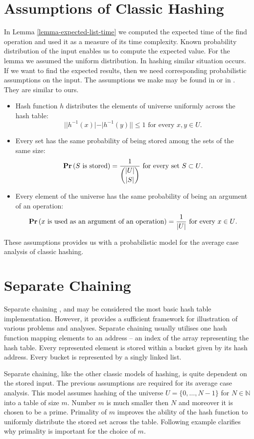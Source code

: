 \section{Assumptions of Classic Hashing}
\label{section-assumptions}
In Lemma \ref{lemma-expected-list-time} we computed the expected time of the find operation and used it as a measure of its time complexity. Known probability distribution of the input enables us to compute the expected value. For the lemma we assumed the uniform distribution. In hashing similar situation occurs. If we want to find the expected results, then we need corresponding probabilistic assumptions on the input. The assumptions we make may be found in \cite{VK-skripta} or in \cite{DBLP:books/sp/Mehlhorn84}. They are similar to ours.
\begin{itemize}
\item Hash function $h$ distributes the elements of universe uniformly across the hash table:
\[
||h^{-1}(x)| - |h^{-1}(y)|| \leq 1 \text{ for every }x, y \in U \text{.}
\]
\item Every set has the same probability of being stored among the sets of the same size:
\[
\mathbf{Pr}\left(S \text{ is stored}\right) = \frac{1}{\dbinom{|U|}{|S|}} \text{ for every set } S \subset U \text{.}
\]
\item Every element of the universe has the same probability of being an argument of an operation:
\[
\mathbf{Pr}\left(x \text{ is used as an argument of an operation}\right) = \frac{1}{|U|} \text{ for every } x \in U \text{.}
\]
\end{itemize}

These assumptions provides us with a probabilistic model for the average case analysis of classic hashing.

\section{Separate Chaining}
Separate chaining \cite{The-art-of-computer-programming}, \cite{DBLP:books/sp/Mehlhorn84} and \cite{DBLP:books/sp/MehlhornS2008} may be considered the most basic hash table implementation. However, it provides a sufficient framework for illustration of various problems and analyses. Separate chaining usually utilises one hash function mapping elements to an address -- an index of the array representing the hash table. Every represented element is stored within a bucket given by its hash address. Every bucket is represented by a singly linked list. 

Separate chaining, like the other classic models of hashing, is quite dependent on the stored input. The previous assumptions are required for its average case analysis. This model assumes hashing of the universe $U = \{0, \dots, N - 1\}$ for $N \in \mathbb{N}$ into a table of size $m$. Number $m$ is much smaller then $N$ and moreover it is chosen to be a prime. Primality of $m$ improves the ability of the hash function to uniformly distribute the stored set across the table.  Following example clarifies why primality is important for the choice of $m$.

